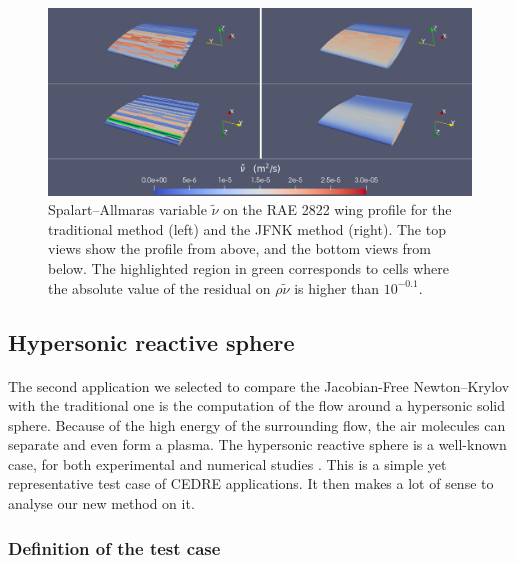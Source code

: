         \begin{figure}
          \centering
          \includegraphics[width=\textwidth]{figures/rae_field_fine.png}
          \caption{
            Spalart--Allmaras variable $\tilde{\nu}$ on the RAE 2822 wing profile for the traditional method (left) and the JFNK method (right).
            The top views show the profile from above, and the bottom views from below.
            The highlighted region in green corresponds to cells where the absolute value of the residual on $\rho \tilde{\nu}$ is higher than $10^{-0.1}$.
          }
          \label{fig:rae_field_fine}
        \end{figure}


    \subsection{Hypersonic reactive sphere}

      \paragraph{}
      The second application we selected to compare the Jacobian-Free Newton--Krylov with the traditional one is the computation of the flow around a hypersonic solid sphere.
      Because of the high energy of the surrounding flow, the air molecules can separate and even form a plasma.
      The hypersonic reactive sphere is a well-known case, for both experimental \cite{Lobb1964} and numerical studies \cite{DobrovGimadievKarpenkoEtAl2022}.
      This is a simple yet representative test case of CEDRE applications.
      It then makes a lot of sense to analyse our new method on it.

      \subsubsection{Definition of the test case}

